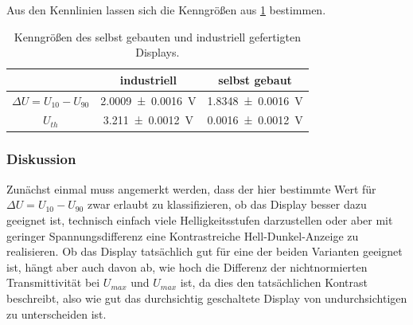 \documentclass[
	a4paper,
	12pt,
	pagesize,
	ngerman
]{scrartcl}
\begin{document}
	Aus den Kennlinien lassen sich die Kenngrößen aus \cref{tb_kenngroessen} bestimmen.
	\begin{table}[H]
		\centering
		\begin{tabular}{ c | c | c }
			 & industriell & selbst gebaut \\ \hline
			$\Delta U=U_{10}-U_{90}$&\SI{2.0009+-0.0016}{V}&\SI{1.8348+-0.0016}{V} \\
			$U_{th}$ & \SI{3.211+-0.0012}{V} & \SI{0.0016+-0.0012}{V} \\
			\hline
		\end{tabular}
		\caption{Kenngrößen des selbst gebauten und industriell gefertigten Displays.}
		\label{tb_kenngroessen}
\end{table}

	\subsubsection{Diskussion}
	Zunächst einmal muss angemerkt werden, dass der hier bestimmte Wert für $\Delta U=U_{10}-U_{90}$ zwar erlaubt zu klassifizieren, ob das Display besser dazu geeignet ist, technisch einfach viele Helligkeitsstufen darzustellen oder aber mit geringer Spannungsdifferenz eine Kontrastreiche Hell-Dunkel-Anzeige zu realisieren.
	Ob das Display tatsächlich gut für eine der beiden Varianten geeignet ist, hängt aber auch davon ab, wie hoch die Differenz der nichtnormierten Transmittivität bei $U_{max}$ und $U_{max}$ ist, da dies den tatsächlichen Kontrast beschreibt, also wie gut das durchsichtig geschaltete Display von undurchsichtigen zu unterscheiden ist.
\end{document}
